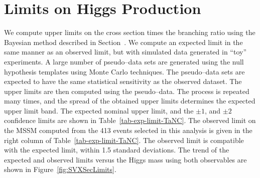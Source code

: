 \section{Limits on Higgs Production}
We compute upper limits on the cross section times the branching ratio using the
Bayesian method described in Section~\label{sec:statmethod}. We compute an
expected limit in the same manner as an observed limit, but with simulated data
generated in ``toy'' experiments.  A large number of pseudo--data sets are
generated using the null hypothesis templates  using Monte Carlo techniques.  The pseudo--data sets are expected to
have the same statistical sensitivity as the observed dataset.  The upper limits
are then computed using the pseudo--data.   The process is repeated many times,
and the spread of the obtained upper limits determines the expected upper limit
band.  The expected nominal upper limit, and the $\pm1$, and $\pm2$ confidence
limits are shown in Table~\ref{tab-exp-limit-TaNC}.  The observed limit on the
MSSM computed from the 413 events selected in this analysis is given in the
right column of Table~\ref{tab-exp-limit-TaNC}.  The observed limit is
compatible with the expected limit, within 1.5 standard deviations.  The trend
of the expected and observed limits versus the Higgs mass using both observables
are shown in Figure~\ref{fig:SVXSecLimits}.  
%
%
